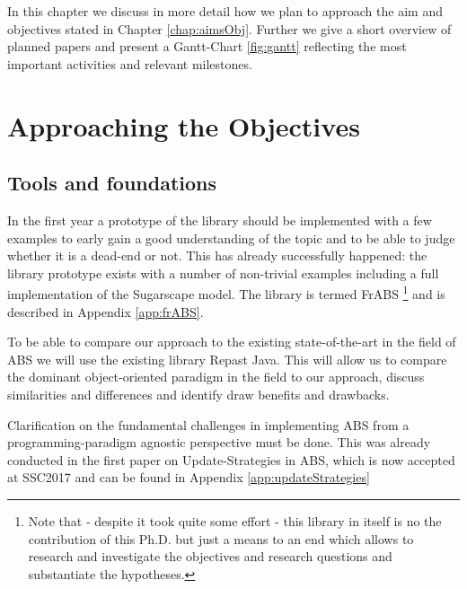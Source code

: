 In this chapter we discuss in more detail how we plan to approach the aim and objectives stated in Chapter \ref{chap:aimsObj}. Further we give a short overview of planned papers and present a Gantt-Chart \ref{fig:gantt} reflecting the most important activities and relevant milestones.

\section{Approaching the Objectives}

\subsection{Tools and foundations}
In the first year a prototype of the library should be implemented with a few examples to early gain a good understanding of the topic and to be able to judge whether it is a dead-end or not. This has already successfully happened: the library prototype exists with a number of non-trivial examples including a full implementation of the Sugarscape model. The library is termed FrABS \footnote{Note that - despite it took quite some effort - this library in itself is no the contribution of this Ph.D. but just a means to an end which allows to research and investigate the objectives and research questions and substantiate the hypotheses.} and is described in Appendix \ref{app:frABS}.

To be able to compare our approach to the existing state-of-the-art in the field of ABS we will use the existing library Repast Java. This will allow us to compare the dominant object-oriented paradigm in the field to our approach, discuss similarities and differences and identify draw benefits and drawbacks. 

Clarification on the fundamental challenges in implementing ABS from a programming-paradigm agnostic perspective must be done. This was already conducted in the first paper on Update-Strategies in ABS, which is now accepted at SSC2017 and can be found in Appendix \ref{app:updateStrategies}

